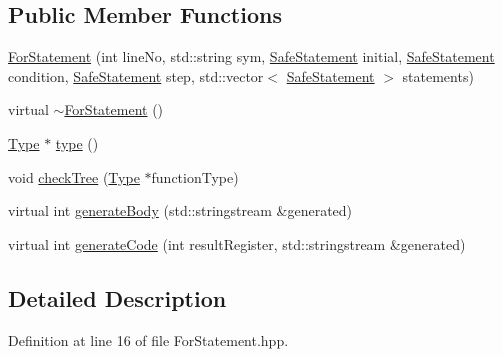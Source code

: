 \subsection*{Public Member Functions}
\begin{DoxyCompactItemize}
\item 
\hyperlink{class_scribble_core_1_1_for_statement_a3a1f10df3149454ad762a3ea291e8ade}{For\-Statement} (int line\-No, std\-::string sym, \hyperlink{namespace_scribble_core_a2ad5bf236bc9164cb56f564685f15a11}{Safe\-Statement} initial, \hyperlink{namespace_scribble_core_a2ad5bf236bc9164cb56f564685f15a11}{Safe\-Statement} condition, \hyperlink{namespace_scribble_core_a2ad5bf236bc9164cb56f564685f15a11}{Safe\-Statement} step, std\-::vector$<$ \hyperlink{namespace_scribble_core_a2ad5bf236bc9164cb56f564685f15a11}{Safe\-Statement} $>$ statements)
\item 
virtual \hyperlink{class_scribble_core_1_1_for_statement_a1fab51c4535a1e11f65806cc81fbd588}{$\sim$\-For\-Statement} ()
\item 
\hyperlink{class_scribble_core_1_1_type}{Type} $\ast$ \hyperlink{class_scribble_core_1_1_for_statement_a386871e99b23b5f1244691d331c8135b}{type} ()
\item 
void \hyperlink{class_scribble_core_1_1_for_statement_a91e40d9fd84d15bc28cd7fafa6be5aa2}{check\-Tree} (\hyperlink{class_scribble_core_1_1_type}{Type} $\ast$function\-Type)
\item 
virtual int \hyperlink{class_scribble_core_1_1_for_statement_a0e5835e399600380f0b5485ca4e49f6e}{generate\-Body} (std\-::stringstream \&generated)
\item 
virtual int \hyperlink{class_scribble_core_1_1_for_statement_a342b11d90c876e6c4da5364947b8f34d}{generate\-Code} (int result\-Register, std\-::stringstream \&generated)
\end{DoxyCompactItemize}


\subsection{Detailed Description}


Definition at line 16 of file For\-Statement.\-hpp.



